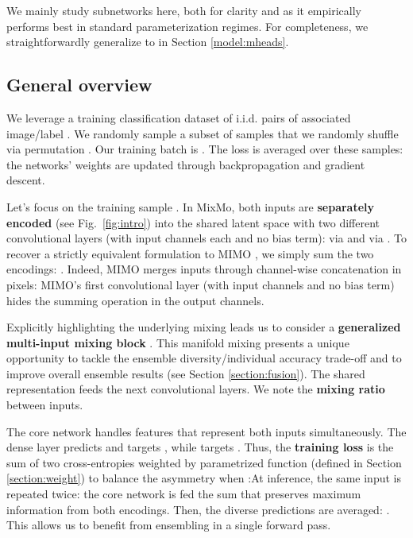 \documentclass[10pt,twocolumn,letterpaper]{article}
\begin{document}
We mainly study  subnetworks here, both for clarity and as it empirically
performs best in standard parameterization regimes. For completeness, we
straightforwardly generalize to  in Section \ref{model:mheads}.

\subsection{General overview}
We leverage a training classification dataset  of i.i.d. pairs of associated image/label . We randomly sample a subset of  samples  that we randomly shuffle via permutation . Our training batch is . The loss  is averaged over these  samples: the networks' weights are updated through backpropagation and gradient descent.

Let's focus on the training sample . In MixMo, both inputs are \textbf{separately encoded} (see Fig.~\ref{fig:intro}) into the shared latent space with two different convolutional layers (with  input channels each and no bias term):  via  and  via . To recover a strictly equivalent formulation to MIMO \cite{havasi2020raining}, we simply sum the two encodings: . Indeed, MIMO merges inputs through channel-wise concatenation in pixels: MIMO's first convolutional layer (with  input channels and no bias term) hides the summing operation in the output channels.

Explicitly highlighting the underlying mixing leads us to consider a \textbf{generalized multi-input mixing block} . This manifold mixing presents a unique opportunity to tackle the ensemble diversity/individual accuracy trade-off and to improve overall ensemble results (see Section \ref{section:fusion}). The shared representation  feeds the next convolutional layers. We note  the \textbf{mixing ratio} between inputs.

The core network  handles features that represent both inputs simultaneously. The dense layer  predicts  and targets , while  targets . Thus, the \textbf{training loss} is the sum of two cross-entropies  weighted by parametrized function  (defined in Section \ref{section:weight}) to balance the asymmetry when :At inference, the same input  is repeated twice: the core network  is fed the sum  that preserves maximum information from both encodings. Then, the diverse predictions are averaged: . This allows us to benefit from ensembling in a single forward pass.
\end{document}
